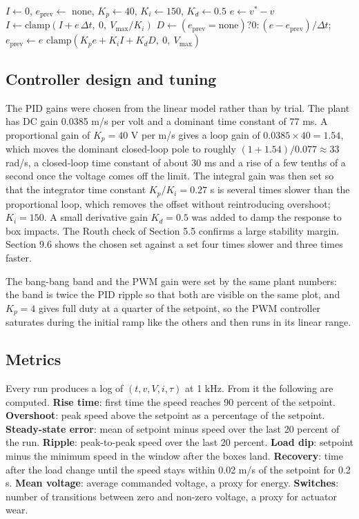 \documentclass[12pt,a4paper]{article}
\begin{document}
\begin{algorithm}[htbp]
\caption{PID speed control with integrator clamping}
\label{alg:pid}
\begin{algorithmic}[1]
\State $I \gets 0$, $e_{\text{prev}} \gets$ none, $K_p \gets 40$, $K_i \gets 150$, $K_d \gets 0.5$
  \State $e \gets v^* - v$
  \State $I \gets \text{clamp}(I + e\,\Delta t,\ 0,\ V_{\max}/K_i)$
  \State $D \gets (e_{\text{prev}} = \text{none}) ? 0 : (e - e_{\text{prev}})/\Delta t$; \quad $e_{\text{prev}} \gets e$
  \State \Return $\text{clamp}(K_p e + K_i I + K_d D,\ 0,\ V_{\max})$
\EndProcedure
\end{algorithmic}
\end{algorithm}

\subsection{Controller design and tuning}

The PID gains were chosen from the linear model rather than by trial. The plant has DC gain 0.0385 m/s per volt and a dominant time constant of 77 ms. A proportional gain of $K_p = 40$ V per m/s gives a loop gain of $0.0385 \times 40 = 1.54$, which moves the dominant closed-loop pole to roughly $(1 + 1.54)/0.077 \approx 33$ rad/s, a closed-loop time constant of about 30 ms and a rise of a few tenths of a second once the voltage comes off the limit. The integral gain was then set so that the integrator time constant $K_p/K_i = 0.27$ s is several times slower than the proportional loop, which removes the offset without reintroducing overshoot; $K_i = 150$. A small derivative gain $K_d = 0.5$ was added to damp the response to box impacts. The Routh check of Section 5.5 confirms a large stability margin. Section 9.6 shows the chosen set against a set four times slower and three times faster.

The bang-bang band and the PWM gain were set by the same plant numbers: the band is twice the PID ripple so that both are visible on the same plot, and $K_p = 4$ gives full duty at a quarter of the setpoint, so the PWM controller saturates during the initial ramp like the others and then runs in its linear range.

\subsection{Metrics}

Every run produces a log of $(t, v, V, i, \tau)$ at 1 kHz. From it the following are computed. \textbf{Rise time}: first time the speed reaches 90 percent of the setpoint. \textbf{Overshoot}: peak speed above the setpoint as a percentage of the setpoint. \textbf{Steady-state error}: mean of setpoint minus speed over the last 20 percent of the run. \textbf{Ripple}: peak-to-peak speed over the last 20 percent. \textbf{Load dip}: setpoint minus the minimum speed in the window after the boxes land. \textbf{Recovery}: time after the load change until the speed stays within 0.02 m/s of the setpoint for 0.2 s. \textbf{Mean voltage}: average commanded voltage, a proxy for energy. \textbf{Switches}: number of transitions between zero and non-zero voltage, a proxy for actuator wear.
\end{document}
